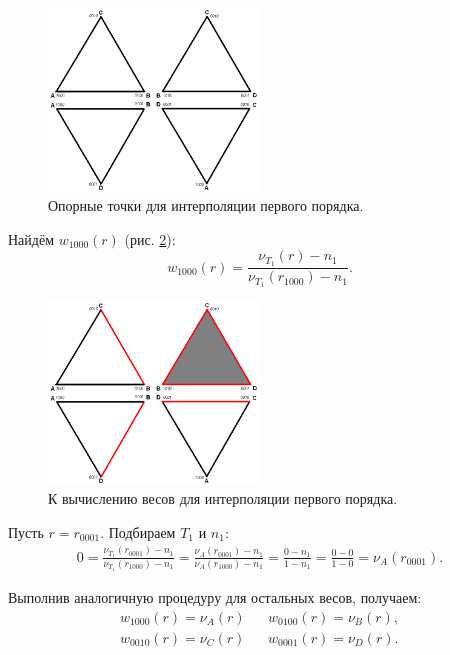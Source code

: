 \begin{figure}[h]
\centering
\includegraphics[width=0.5\textwidth]{png/tetr-interp-1st-order-1.png}
\caption{Опорные точки для интерполяции первого порядка.}
\label{pic:tetr-interpolation-1st-order-1}
\end{figure}

Найдём $w_{1000}(r)$ (рис. \ref{pic:tetr-interpolation-1st-order-2}):
\begin{equation}
w_{1000}(r) = \frac{ \nu_{T_1}(r) - n_1 }{ \nu_{T_1}(r_{1000}) - n_1 }.
\end{equation}

\begin{figure}[h]
\centering
\includegraphics[width=0.5\textwidth]{png/tetr-interp-1st-order-2.png}
\caption{К вычислению весов для интерполяции первого порядка.}
\label{pic:tetr-interpolation-1st-order-2}
\end{figure}

Пусть $r = r_{0001}$. Подбираем $T_1$ и $n_1$:
\begin{align}
0 = \frac{ \nu_{T_1}(r_{0001}) - n_1 }{ \nu_{T_1}(r_{1000}) - n_1 } = \frac{ \nu_{A}(r_{0001}) - n_1 }{ \nu_{A}(r_{1000}) - n_1 } = \frac{0-n_1}{1-n_1} = \frac{0-0}{1-0} = \nu_{A}(r_{0001}).
\end{align}

Выполнив аналогичную процедуру для остальных весов, получаем:
\begin{align}
w_{1000}(r) = \nu_{A}(r) & & w_{0100}(r) = \nu_{B}(r), \nonumber\\
w_{0010}(r) = \nu_{C}(r) & & w_{0001}(r) = \nu_{D}(r).
\end{align}


